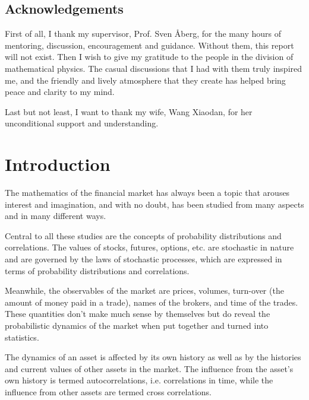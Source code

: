 \documentclass{report}
\begin{document}
\section*{Acknowledgements}
First of all, I thank my supervisor, Prof. Sven \AA berg, for the many
hours of mentoring, discussion, encouragement and guidance. Without
them, this report will not exist. Then I wish to give my gratitude to
the people in the division of mathematical physics. The casual
discussions that I had with them truly inspired me, and
the friendly and lively atmosphere that they create has helped bring
peace and clarity to my mind.

Last but not least, I want to thank my wife, Wang Xiaodan, for her
unconditional support and understanding.

\tableofcontents


\printglossaries

\chapter{Introduction} \label{chp:introduction}
The mathematics of the financial market has always been a topic that
arouses interest and imagination, and with no doubt, has been
studied from many aspects and in many different ways.

Central to all these studies are the concepts of probability
distributions and correlations. The values of stocks, futures,
options, etc. are stochastic in nature and are governed by the laws of
stochastic processes, which are expressed in terms of probability
distributions and correlations.

Meanwhile, the observables of the market are prices, volumes,
turn-over (the amount of money paid in a trade), names of the brokers,
and time of the trades. These quantities don't make much sense
by themselves but do reveal the probabilistic dynamics of the market
when put together and turned into statistics.

The dynamics of an asset is affected by its own history as well as by
the histories and current values of other assets in the market. The
influence from the asset's own history is termed autocorrelations,
i.e. correlations in time, while the influence from other assets are
termed cross correlations.
\end{document}
